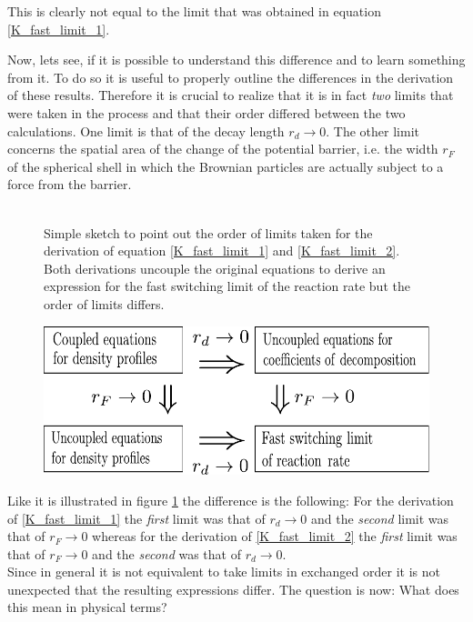This is clearly not equal to the limit that was obtained in equation \eqref{K_fast_limit_1}.\par
Now, lets see, if it is possible to understand this difference and to learn something from it. To do so it is useful to properly outline the differences in the derivation of these results.
Therefore it is crucial to realize that it is in fact \emph{two} limits that were taken in the process and that their order differed between the two calculations. One limit is that of the decay length $r_d \rightarrow 0$. The other limit concerns the spatial area of the change of the potential barrier, i.e. the width $r_F$ of the spherical shell in which the Brownian particles are actually subject to a force from the barrier. \\
\vspace{-.8 cm} \\
\begin{minipage}[t]{0.372 \textwidth}
    \begin{figure}[H]
        \caption{Simple sketch to point out the order of limits taken for the derivation of equation \eqref{K_fast_limit_1} and \eqref{K_fast_limit_2}. Both derivations uncouple the original equations to derive an expression for the fast switching limit of the reaction rate but the order of limits differs. \label{sketch_of_limits}}
    \end{figure}
\end{minipage}\hspace{0.01 \textwidth} \begin{minipage}[t]{.608 \textwidth}
\begin{figure}[H]
    \centering
    \includegraphics[width = 1 \textwidth]{plots/limits.pdf}
\end{figure}
\end{minipage}\par
Like it is illustrated in figure \ref{sketch_of_limits} the difference is the following: For the derivation of \eqref{K_fast_limit_1} the \emph{first} limit was that of $r_d \rightarrow 0$ and the \emph{second} limit was that of $r_F \rightarrow 0$ whereas for the derivation of \eqref{K_fast_limit_2} the \emph{first} limit was that of $r_F \rightarrow 0$ and the \emph{second} was that of $r_d \rightarrow 0$. \\
Since in general it is not equivalent to take limits in exchanged order it is not unexpected that the resulting expressions differ. The question is now: What does this mean in physical terms? \\

